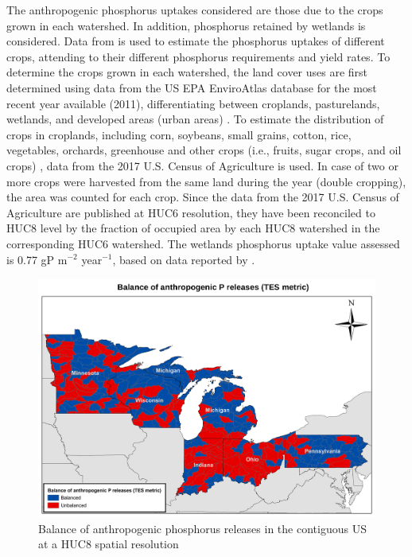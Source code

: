 \begin{refsection}[referencesCh4]
The anthropogenic phosphorus uptakes considered are those due to the crops grown in each watershed. In addition, phosphorus retained by wetlands is considered. Data from \citet{USDAWaste} is used to estimate the phosphorus uptakes of different crops, attending to their different phosphorus requirements and yield rates. To determine the crops grown in each watershed, the land cover uses are first determined using data from the US EPA EnviroAtlas database for the most recent year available (2011), differentiating between croplands, pasturelands, wetlands, and developed areas (urban areas) \citep{EnviroAtlas}. To estimate the distribution of crops in croplands, including corn, soybeans, small grains, cotton, rice, vegetables, orchards, greenhouse and other crops (i.e., fruits, sugar crops, and oil crops) \citep{2017CensusofAgriculture}, data from the 2017 U.S. Census of Agriculture is used. In case of two or more crops were harvested from the same land during the year (double cropping), the area was counted for each crop. Since the data from the 2017 U.S. Census of Agriculture are published at HUC6 resolution, they have been reconciled to HUC8 level by the fraction of occupied area by each HUC8 watershed in the corresponding HUC6 watershed. The wetlands phosphorus uptake value assessed is 0.77 gP m$^{-2}$ year$^{-1}$, based on data reported by \citet{Kadlec}.

\begin{figure}[h]
	\centering
	\includegraphics[width=0.95\linewidth, trim={0cm 0cm 0cm 0cm},clip]{gfx/AppendixC/BalanceofP.pdf} 
	\caption{Balance of anthropogenic phosphorus releases in the contiguous US at a HUC8 spatial resolution}
	\label{fig:TECmap_AppC}
\end{figure}


\end{refsection}
